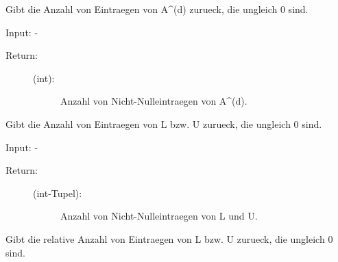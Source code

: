 \documentclass[letterpaper,10pt,ngerman]{sphinxmanual}
\begin{document}
\begin{fulllineitems}
\begin{fulllineitems}
\begin{description}
\begin{description}
\end{description}

\end{description}

\end{fulllineitems}


\begin{fulllineitems}
\label{\detokenize{index:sparse_erw.Sparse.anz_nn_abs}}
Gibt die Anzahl von Eintraegen von A\textasciicircum{}(d) zurueck, die ungleich 0 sind.

Input: -
\begin{description}
\item[{Return:}] \leavevmode\begin{description}
\item[{(int):}] \leavevmode
Anzahl von Nicht-Nulleintraegen von A\textasciicircum{}(d).

\end{description}

\end{description}

\end{fulllineitems}


\begin{fulllineitems}
\label{\detokenize{index:sparse_erw.Sparse.anz_nn_lu_abs}}
Gibt die Anzahl von Eintraegen von L bzw. U zurueck, die ungleich 0 sind.

Input: -
\begin{description}
\item[{Return:}] \leavevmode\begin{description}
\item[{(int-Tupel):}] \leavevmode
Anzahl von Nicht-Nulleintraegen von L und U.

\end{description}

\end{description}

\end{fulllineitems}


\begin{fulllineitems}
\label{\detokenize{index:sparse_erw.Sparse.anz_nn_lu_rel}}
Gibt die relative Anzahl von Eintraegen von L bzw. U zurueck, die ungleich 0 sind.


\end{fulllineitems}
\end{fulllineitems}
\end{document}

